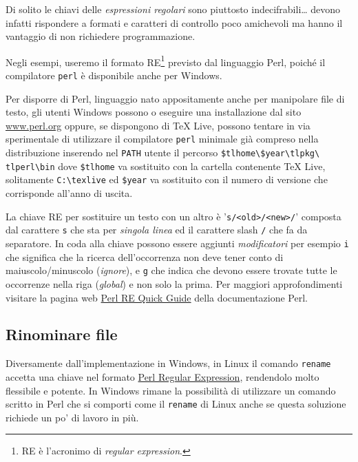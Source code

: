 Di solito le chiavi delle \emph{espressioni regolari} sono piuttosto
indecifrabili\dots{} devono infatti rispondere a formati e caratteri di
controllo poco amichevoli ma hanno il vantaggio di non richiedere
programmazione.

Negli esempi, useremo il formato RE\footnote{RE è l'acronimo di \emph{regular
expression}.} previsto dal linguaggio Perl, poiché il compilatore \texttt{perl}
è disponibile anche per Windows.

Per disporre di Perl, linguaggio nato appositamente anche per manipolare file di
testo, gli utenti Windows possono o eseguire una installazione dal sito
\url{www.perl.org} oppure, se dispongono di \TeX{} Live, possono tentare in via
sperimentale di utilizzare il compilatore \texttt{perl} minimale già compreso
nella distribuzione inserendo nel \texttt{PATH} utente il percorso
\texttt{\$tlhome\textbackslash\$year\textbackslash tlpkg\textbackslash
tlperl\textbackslash bin} dove \texttt{\$tlhome} va sostituito con la cartella
contenente \TeX{} Live, solitamente \texttt{C:\textbackslash texlive} ed
\texttt{\$year} va sostituito con il numero di versione che corrisponde all'anno
di uscita.

La chiave RE per sostituire un testo con un altro è '\verb=s/<old>/<new>/='
composta dal carattere \texttt{s} che sta per \emph{singola linea} ed il
carattere slash \texttt{/} che fa da separatore. In coda alla chiave possono
essere aggiunti \emph{modificatori} per esempio \texttt{i} che significa che la
ricerca dell'occorrenza non deve tener conto di maiuscolo/minuscolo
(\emph{ignore}), e \texttt{g} che indica che devono essere trovate tutte le
occorrenze nella riga (\emph{global}) e non solo la prima. Per maggiori
approfondimenti visitare la pagina web
\href{http://perldoc.perl.org/perlrequick.html}{Perl RE Quick Guide} della
documentazione Perl.


\subsection{Rinominare file}

Diversamente dall'implementazione in Windows, in Linux il comando
\texttt{rename} accetta una chiave nel formato
\href{http://perldoc.perl.org/perlrequick.html}{Perl Regular Expression},
rendendolo molto flessibile e potente. In Windows rimane la possibilità di
utilizzare un comando scritto in Perl che si comporti come il \texttt{rename} di
Linux anche se questa soluzione richiede un po' di lavoro in più.

